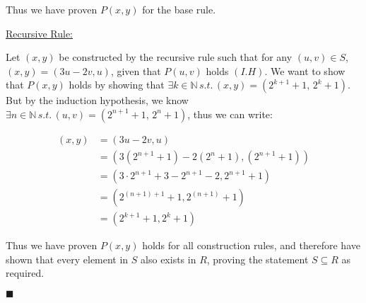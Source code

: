 \documentclass[20pt]{article}
\begin{document}
\noindent 
\begin{text}
    Thus we have proven $P(x,y)$ for the base rule.\\
\end{text}

\noindent
\underline{Recursive Rule:}

\noindent 
\begin{text}
    Let $(x,y)$ be constructed by the recursive rule such that for any $(u,v) \in S$, $(x,y) = (3u-2v, u)$, given that $P(u,v)$ holds $(I.H)$. We want to show that $P(x,y)$ holds by showing that $\exists k \in \mathbb{N} \nonumber \, s.t. \, (x,y) = (2^{k + 1} + 1, \, 2^{k} + 1)$. But by the induction hypothesis, we know $\exists n \in \mathbb{N} \nonumber \, s.t. \, (u,v) = (2^{n + 1} + 1, \, 2^{n} + 1)$, thus we can write:
\end{text}

\begin{align}
    (x,y) &= (3u-2v,u)\nonumber\\
    &= (3(2^{n + 1} + 1) - 2(2^{n} + 1), (2^{n + 1} + 1)) \tag{By I.H}\nonumber\\
    &= (3 \cdot 2^{n + 1} + 3 - 2^{n + 1} - 2, 2^{n + 1} + 1)\nonumber\\
    &= (2^{(n + 1) + 1} + 1, 2^{(n + 1)} + 1)\nonumber\\
    &= (2^{k + 1} + 1, 2^{k} + 1)\tag{Choose $k = n + 1$}\nonumber
\end{align}

\noindent 
\begin{text}
    Thus we have proven $P(x,y)$ holds for all construction rules, and therefore have shown that every element in $S$ also exists in $R$, proving the statement $S \subseteq R$ as required.\\
\end{text}

\hfill $\blacksquare$

\end{document}
